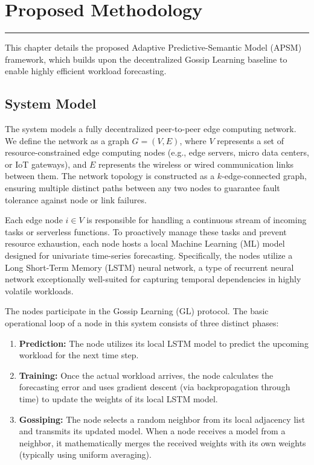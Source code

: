 \chapter{Proposed Methodology}
\noindent \rule{6.6in}{0.01in}
\vspace{0.5cm}

This chapter details the proposed Adaptive Predictive-Semantic Model (APSM) framework, which builds upon the decentralized Gossip Learning baseline to enable highly efficient workload forecasting. 

\section{System Model}
The system models a fully decentralized peer-to-peer edge computing network. We define the network as a graph $G = (V, E)$, where $V$ represents a set of resource-constrained edge computing nodes (e.g., edge servers, micro data centers, or IoT gateways), and $E$ represents the wireless or wired communication links between them. The network topology is constructed as a $k$-edge-connected graph, ensuring multiple distinct paths between any two nodes to guarantee fault tolerance against node or link failures.

Each edge node $i \in V$ is responsible for handling a continuous stream of incoming tasks or serverless functions. To proactively manage these tasks and prevent resource exhaustion, each node hosts a local Machine Learning (ML) model designed for univariate time-series forecasting. Specifically, the nodes utilize a Long Short-Term Memory (LSTM) neural network, a type of recurrent neural network exceptionally well-suited for capturing temporal dependencies in highly volatile workloads.

The nodes participate in the Gossip Learning (GL) protocol. The basic operational loop of a node in this system consists of three distinct phases:
\begin{enumerate}
    \item \textbf{Prediction:} The node utilizes its local LSTM model to predict the upcoming workload for the next time step.
    \item \textbf{Training:} Once the actual workload arrives, the node calculates the forecasting error and uses gradient descent (via backpropagation through time) to update the weights of its local LSTM model.
    \item \textbf{Gossiping:} The node selects a random neighbor from its local adjacency list and transmits its updated model. When a node receives a model from a neighbor, it mathematically merges the received weights with its own weights (typically using uniform averaging).
\end{enumerate}

